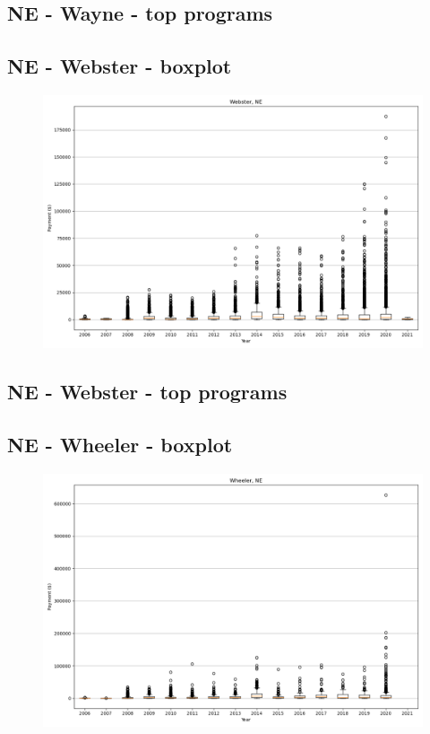 \subsection*{NE - Wayne - top programs}

\newpage
\subsection*{NE - Webster - boxplot}
\begin{figure}[h]
\centering
\includegraphics[width=7in]{../output/boxplots/counties/Webster-NE_boxplot.png}
\end{figure}


\subsection*{NE - Webster - top programs}

\newpage
\subsection*{NE - Wheeler - boxplot}
\begin{figure}[h]
\centering
\includegraphics[width=7in]{../output/boxplots/counties/Wheeler-NE_boxplot.png}
\end{figure}


